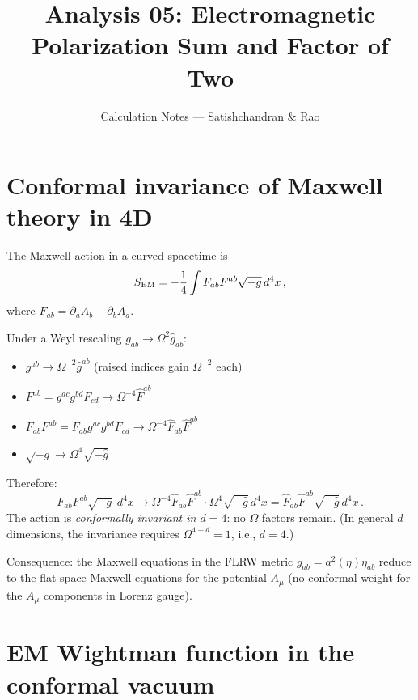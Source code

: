 \documentclass[12pt]{article}
\title{Analysis 05: Electromagnetic Polarization Sum and Factor of Two}
\author{Calculation Notes --- Satishchandran \& Rao}
\date{}
\newcommand{\Scfac}{a}
\newcommand{\pd}{\partial}
\begin{document}
\maketitle

\section*{Conformal invariance of Maxwell theory in 4D}

The Maxwell action in a curved spacetime is
%
\begin{equation}
  S_{\rm EM} = -\frac{1}{4}\int F_{ab}F^{ab}\sqrt{-g}\,d^{4}x \,,
\end{equation}
%
where $F_{ab} = \pd_{a}A_{b}-\pd_{b}A_{a}$.

Under a Weyl rescaling $g_{ab}\to\Omega^{2}\hat{g}_{ab}$:
\begin{itemize}
\item $g^{ab}\to\Omega^{-2}\hat{g}^{ab}$ (raised indices gain $\Omega^{-2}$ each)
\item $F^{ab} = g^{ac}g^{bd}F_{cd}\to\Omega^{-4}\hat{F}^{ab}$
\item $F_{ab}F^{ab} = F_{ab}g^{ac}g^{bd}F_{cd}\to\Omega^{-4}\hat{F}_{ab}\hat{F}^{ab}$
\item $\sqrt{-g}\to\Omega^{4}\sqrt{-\hat{g}}$
\end{itemize}
Therefore:
%
\begin{equation}
  F_{ab}F^{ab}\sqrt{-g}\;d^{4}x
  \to
  \Omega^{-4}\hat{F}_{ab}\hat{F}^{ab}\cdot\Omega^{4}\sqrt{-\hat{g}}\,d^{4}x
  = \hat{F}_{ab}\hat{F}^{ab}\sqrt{-\hat{g}}\,d^{4}x \,.
\end{equation}
%
The action is \emph{conformally invariant in $d=4$}: no $\Omega$ factors remain.
(In general $d$ dimensions, the invariance requires $\Omega^{4-d}=1$, i.e., $d=4$.)

Consequence: the Maxwell equations in the FLRW metric $g_{ab} = \Scfac^{2}(\eta)\eta_{ab}$
reduce to the flat-space Maxwell equations for the potential $A_{\mu}$ (no conformal weight
for the $A_{\mu}$ components in Lorenz gauge).

\section*{EM Wightman function in the conformal vacuum}
\end{document}

